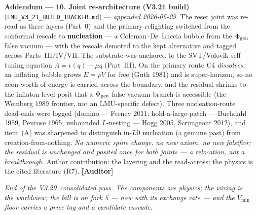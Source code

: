 \documentclass[11pt]{article}
\newcommand{\lmuver}{3.29}
\newcommand{\Auditor}{\textbf{\textcolor{teal!55!black}{[Auditor]}}}
\begin{document}
\smallskip\noindent\textbf{Addendum --- 10. Joint re-architecture (V3.21 build)} (\texttt{LMU\_V3\_21\_BUILD\_TRACKER.md}) --- \emph{appended 2026-06-29}. The reset joint was re-read as three layers (Part~0) and the primary relighting switched from the conformal rescale to \textbf{nucleation} --- a Coleman--De~Luccia bubble from the $\Phi_{\rm gen}$ false vacuum --- with the rescale demoted to the kept alternative and tagged across Parts~III/IV/VII. The substrate was anchored to the SVT/Volovik self-tuning equation $\Lambda=\epsilon(q)-\mu q$ (Part~III). On the primary route C4 \emph{dissolves}: an inflating bubble grows $E=\rho V$ for free (Guth 1981) and is super-horizon, so no aeon-worth of energy is carried across the boundary, and the residual shrinks to the inflaton-level posit that a $\Phi_{\rm gen}$ false-vacuum branch is accessible (the Weinberg 1989 frontier, not an LMU-specific defect). Three nucleation-route dead-ends were logged (domino --- Feeney 2011; hold-a-large-patch --- Buchdahl 1959, Penrose 1965; unbounded $L$-nesting --- Hogg 2005, Scrimgeour 2012), and item~(A) was sharpened to distinguish in-$L0$ nucleation (a genuine past) from creation-from-nothing. \emph{No numeric spine change, no new axiom, no new falsifier; the residual is unchanged and posited once for both joints --- a relocation, not a breakthrough.} Author contribution: the layering and the read-across; the physics is the cited literature (R7). \Auditor

\vspace{6pt}\centering\small\textit{End of the V\lmuver\ consolidated pass. The components are physics; the wiring is the worldview; the bill is on fork 5 --- now with its exchange rate --- and the $V_{\min}$ floor carries a price tag and a candidate cascade.}
\end{document}
